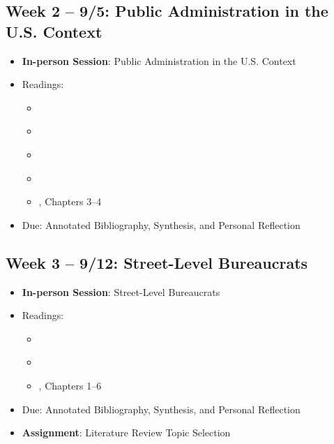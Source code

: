 \documentclass[12pt, letterpaper]{article}
\begin{document}
\subsection*{Week 2 -- 9/5: Public Administration in the U.S. Context}
\begin{itemize}
    \item \textbf{In-person Session}: Public Administration in the U.S. Context
    \item Readings:
    \begin{itemize}
        \item \cite{Allison1990}
        \item \cite{Kaufman1969}
        \item \cite{Kettl2020a}
        \item \cite{Overeem2005}
        \item \cite{Denhardt2015}, Chapters 3--4
    \end{itemize}
    \item Due: Annotated Bibliography, Synthesis, and Personal Reflection
\end{itemize}

\subsection*{Week 3 -- 9/12: Street-Level Bureaucrats}
\begin{itemize}
    \item \textbf{In-person Session}: Street-Level Bureaucrats
    \item Readings:
    \begin{itemize}
        \item \cite{Lipsky1980}
        \item \cite{MaynardMoody2012}
        \item \cite{Lipsky2010}, Chapters 1--6
    \end{itemize}
\item Due: Annotated Bibliography, Synthesis, and Personal Reflection
\item \textbf{Assignment}: Literature Review Topic Selection
\end{itemize}
\end{document}
